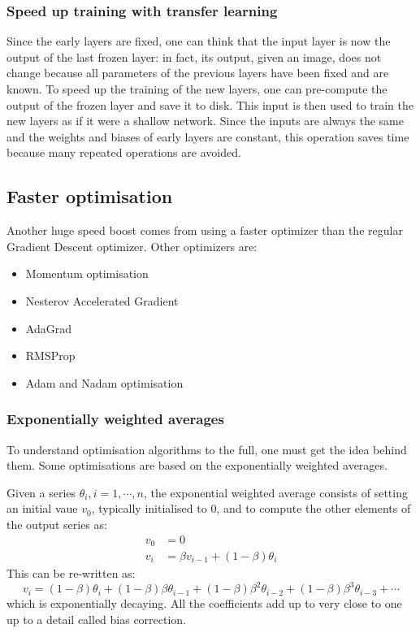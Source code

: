 \subsubsection{Speed up training with transfer learning}
Since the early layers are fixed, one can think that the input layer is now the output of the last frozen layer: in fact, its output, given an image, does not change because all parameters of the previous layers have been fixed and are known. To speed up the training of the new layers, one can pre-compute the output of the frozen layer and save it to disk. This input is then used to train the new layers as if it were a shallow network. Since the inputs are always the same and the weights and biases of early layers are constant, this operation saves time because many repeated operations are avoided.

\subsection{Faster optimisation}
Another huge speed boost comes from using a faster optimizer than the regular Gradient Descent optimizer. Other optimizers are:
\begin{itemize}
\item Momentum optimisation
\item Nesterov Accelerated Gradient
\item AdaGrad
\item RMSProp
\item Adam and Nadam optimisation
\end{itemize}

\subsubsection{Exponentially weighted averages}
\label{subsubsec:ExpWeightedAvg}
To understand optimisation algorithms to the full, one must get the idea behind them. Some optimisations are based on the exponentially weighted averages.

Given a series $\theta_i, i=1,\cdots, n$, the exponential weighted average consists of setting an initial vaue $v_0$, typically initialised to $0$, and to compute the other elements of the output series as:
\begin{equation}
\begin{aligned}
v_0 &= 0\\
v_i &= \beta v_{i-1}+(1-\beta) \theta_i 
\end{aligned}
\end{equation}
This can be re-written as:
\begin{equation}
v_i = (1-\beta) \theta_i +  (1-\beta) \beta \theta_{i-1} + (1-\beta) \beta^2 \theta_{i-2} + (1-\beta) \beta^3 \theta_{i-3} + \cdots  
\end{equation}
which is exponentially decaying. All the coefficients add up to very close to one up to a detail called bias correction.

